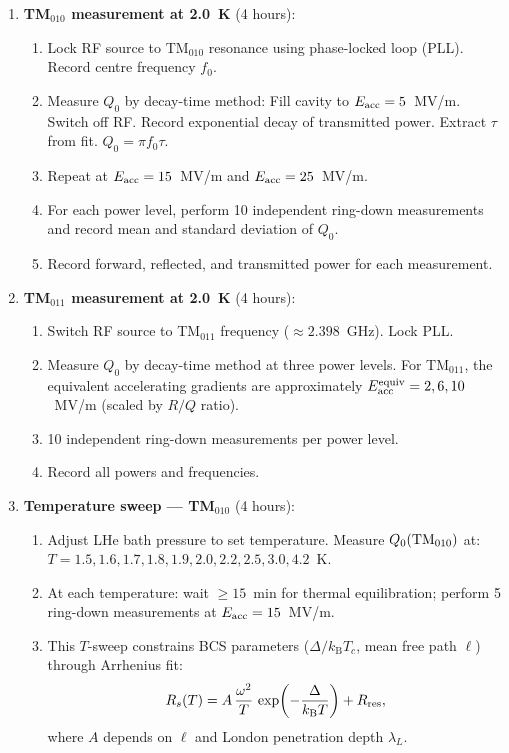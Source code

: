 \documentclass[11pt]{article}
\newcommand{\kB}{k_{\mathrm{B}}}
\theoremstyle{definition}
\theoremstyle{remark}
\begin{document}
\begin{tcolorbox}[colback=white, colframe=black,
  title=\textbf{PHASE 0a: MEASUREMENT PROTOCOL (14 days, 6 cooldowns)},
  breakable]
\begin{enumerate}[label=\textbf{C\arabic*.}, leftmargin=2cm]
\item \textbf{TM$_{010}$ measurement at 2.0~K} (4 hours):
  \begin{enumerate}[nosep, label=(\alph*)]
  \item Lock RF source to TM$_{010}$ resonance using phase-locked
    loop (PLL). Record centre frequency $f_0$.
  \item Measure $Q_0$ by decay-time method: Fill cavity to
    $E_{\rm acc} = 5$~MV/m. Switch off RF. Record exponential
    decay of transmitted power. Extract $\tau$ from fit.
    $Q_0 = \pi f_0 \tau$.
  \item Repeat at $E_{\rm acc} = 15$~MV/m and $E_{\rm acc} = 25$~MV/m.
  \item For each power level, perform 10 independent ring-down
    measurements and record mean and standard deviation of $Q_0$.
  \item Record forward, reflected, and transmitted power for
    each measurement.
  \end{enumerate}

\item \textbf{TM$_{011}$ measurement at 2.0~K} (4 hours):
  \begin{enumerate}[nosep, label=(\alph*)]
  \item Switch RF source to TM$_{011}$ frequency ($\approx 2.398$~GHz).
    Lock PLL.
  \item Measure $Q_0$ by decay-time method at three power levels.
    For TM$_{011}$, the equivalent accelerating gradients are
    approximately $E_{\rm acc}^{\rm equiv} = 2, 6, 10$~MV/m
    (scaled by $R/Q$ ratio).
  \item 10 independent ring-down measurements per power level.
  \item Record all powers and frequencies.
  \end{enumerate}

\item \textbf{Temperature sweep --- TM$_{010}$} (4 hours):
  \begin{enumerate}[nosep, label=(\alph*)]
  \item Adjust LHe bath pressure to set temperature. Measure
    $Q_0({\rm TM}_{010})$ at:
    $T = 1.5, 1.6, 1.7, 1.8, 1.9, 2.0, 2.2, 2.5, 3.0, 4.2$~K.
  \item At each temperature: wait $\geq 15$~min for thermal
    equilibration; perform 5 ring-down measurements at
    $E_{\rm acc} = 15$~MV/m.
  \item This $T$-sweep constrains BCS parameters
    ($\Delta/\kB T_c$, mean free path $\ell$) through Arrhenius fit:
    \begin{equation}
    R_s(T) = A\,\frac{\omega^2}{T}\,
    \exp\!\left(-\frac{\Delta}{\kB T}\right) + R_{\rm res},
    \end{equation}
    where $A$ depends on $\ell$ and London penetration depth
    $\lambda_L$.
  \end{enumerate}


\end{enumerate}
\end{tcolorbox}
\end{document}
